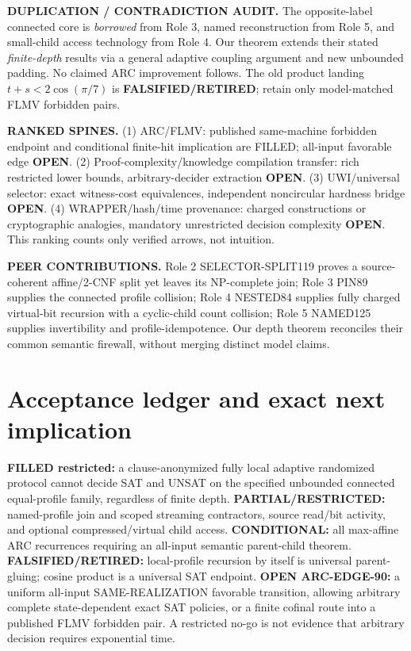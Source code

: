 \documentclass[11pt]{article}
\begin{document}
\noindent\textbf{DUPLICATION / CONTRADICTION AUDIT.} The opposite-label connected core is \emph{borrowed} from Role 3, named reconstruction from Role 5, and small-child access technology from Role 4. Our theorem extends their stated \emph{finite-depth} results via a general adaptive coupling argument and new unbounded padding. No claimed ARC improvement follows. The old product landing \(t+s<2\cos(\pi/7)\) is \textbf{FALSIFIED/RETIRED}; retain only model-matched FLMV forbidden pairs.

\noindent\textbf{RANKED SPINES.} (1) ARC/FLMV: published same-machine forbidden endpoint and conditional finite-hit implication are FILLED; all-input favorable edge \textbf{OPEN}. (2) Proof-complexity/knowledge compilation transfer: rich restricted lower bounds, arbitrary-decider extraction \textbf{OPEN}. (3) UWI/universal selector: exact witness-cost equivalences, independent noncircular hardness bridge \textbf{OPEN}. (4) WRAPPER/hash/time provenance: charged constructions or cryptographic analogies, mandatory unrestricted decision complexity \textbf{OPEN}. This ranking counts only verified arrows, not intuition.

\noindent\textbf{PEER CONTRIBUTIONS.} Role 2 SELECTOR-SPLIT119 proves a source-coherent affine/2-CNF split yet leaves its NP-complete join; Role 3 PIN89 supplies the connected profile collision; Role 4 NESTED84 supplies fully charged virtual-bit recursion with a cyclic-child count collision; Role 5 NAMED125 supplies invertibility and profile-idempotence. Our depth theorem reconciles their common semantic firewall, without merging distinct model claims.

\section*{Acceptance ledger and exact next implication}
\noindent \textbf{FILLED restricted:} a clause-anonymized fully local adaptive randomized protocol cannot decide SAT and UNSAT on the specified unbounded connected equal-profile family, regardless of finite depth. \textbf{PARTIAL/RESTRICTED:} named-profile join and scoped streaming contractors, source read/bit activity, and optional compressed/virtual child access. \textbf{CONDITIONAL:} all max-affine ARC recurrences requiring an all-input semantic parent-child theorem. \textbf{FALSIFIED/RETIRED:} local-profile recursion by itself is universal parent-gluing; cosine product is a universal SAT endpoint. \textbf{OPEN ARC-EDGE-90:} a uniform all-input SAME-REALIZATION favorable transition, allowing arbitrary complete state-dependent exact SAT policies, or a finite cofinal route into a published FLMV forbidden pair. A restricted no-go is not evidence that arbitrary decision requires exponential time.
\end{document}
